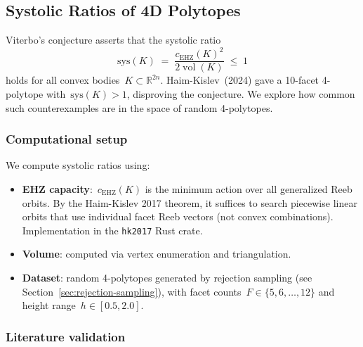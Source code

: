 %

\subsection{Systolic Ratios of 4D Polytopes}
\label{sec:systolic-ratios}

Viterbo's conjecture asserts that the systolic ratio
\[
  \mathrm{sys}(K) \;=\; \frac{c_{\mathrm{EHZ}}(K)^2}{2 \operatorname{vol}(K)}
  \;\le\; 1
\]
holds for all convex bodies~$K \subset \mathbb{R}^{2n}$. Haim-Kislev~(2024)
gave a 10-facet 4-polytope with~$\mathrm{sys}(K) > 1$, disproving the
conjecture. We explore how common such counterexamples are in the space of
random 4-polytopes.

\subsubsection*{Computational setup}

We compute systolic ratios using:
\begin{itemize}
  \item \textbf{EHZ capacity}:~$c_{\mathrm{EHZ}}(K)$ is the minimum action
    over all generalized Reeb orbits. By the Haim-Kislev 2017 theorem, it
    suffices to search piecewise linear orbits that use individual facet
    Reeb vectors (not convex combinations). Implementation in the
    \texttt{hk2017} Rust crate.
  \item \textbf{Volume}: computed via vertex enumeration and triangulation.
  \item \textbf{Dataset}: random 4-polytopes generated by rejection sampling
    (see Section~\ref{sec:rejection-sampling}), with facet
    counts~$F \in \{5, 6, \ldots, 12\}$ and height
    range~$h \in [0.5, 2.0]$.
\end{itemize}

\subsubsection*{Literature validation}

